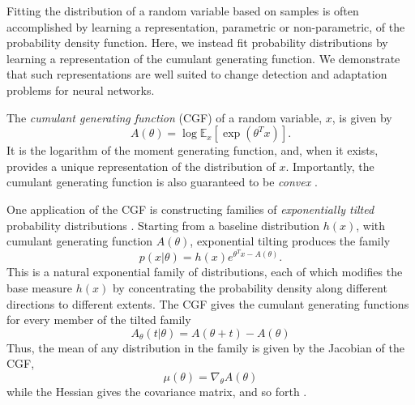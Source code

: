 \documentclass[11pt]{article}      %
\begin{document}
Fitting the distribution of a random variable based on samples is often accomplished by learning a representation, parametric or non-parametric, of the probability density function.
Here, we instead fit probability distributions by learning a representation of the cumulant generating function.
We demonstrate that such representations are well suited to change detection and adaptation problems for neural networks.

The \textit{cumulant generating function} (CGF) of a random variable, $x$, is given by
\begin{equation}
  A(\theta) = \log \mathbb{E}_x[\exp(\theta^T x)]. \label{def:cgf}
\end{equation}
It is the logarithm of the moment generating function, and, when it exists, provides a unique representation of the distribution of $x$.
Importantly, the cumulant generating function is also guaranteed to be \textit{convex} \cite{barndorff2014information}.


One application of the CGF is constructing families of \textit{exponentially tilted} probability distributions \cite{morris_natural_1982,morris_unifying_2009}.
Starting from a baseline distribution $h(x)$, with cumulant generating function $A(\theta)$, exponential tilting produces the family
\begin{equation}
  p(x | \theta) = h(x) e^{\theta^T x - A(\theta)}. \label{def:exponential_tilt}
\end{equation}
This is a natural exponential family of distributions, each of which modifies the base measure $h(x)$ by concentrating the probability density along different directions to different extents.
The CGF gives the cumulant generating functions for every member of the tilted family
\begin{equation}
  A_\theta(t | \theta) = A(\theta + t) - A(\theta) \label{eq:CGF_family}
\end{equation}
Thus, the mean of any distribution in the family is given by the Jacobian of the CGF,
\begin{equation}
  \mu(\theta) = \nabla_\theta A(\theta) \label{eq:cgf_jacobian}
\end{equation}
while the Hessian gives the covariance matrix, and so forth \cite{barndorff2014information}.
\end{document}
